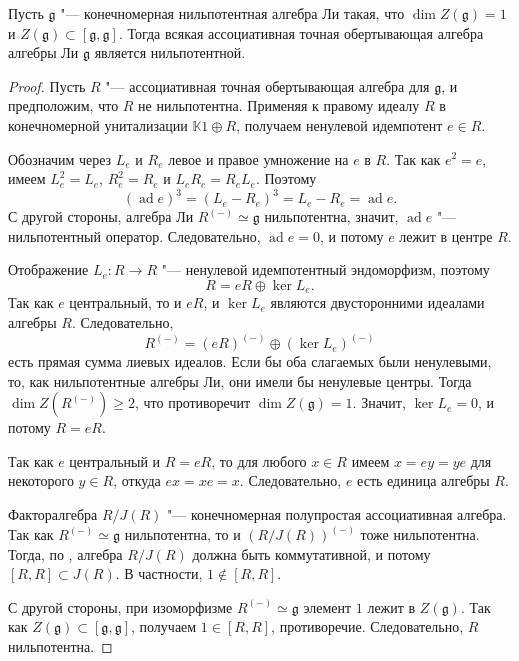 \documentclass[a4paper,14pt,oneside,openany]{memoir}
\begin{document}
\begin{lemma}\label{l:assoc-envelope-nilpotent}
    Пусть $\mathfrak{g}$ "--- конечномерная нильпотентная алгебра Ли такая, что
    $\dim Z(\mathfrak{g})=1$ и $Z(\mathfrak{g})\subset
    [\mathfrak{g},\mathfrak{g}]$. Тогда всякая ассоциативная точная обертывающая
    алгебра алгебры Ли $\mathfrak{g}$ является нильпотентной.
\end{lemma}
\begin{proof}
    Пусть $R$ "--- ассоциативная точная обертывающая алгебра для $\mathfrak{g}$, и
    предположим, что $R$ не нильпотентна. Применяя
     к правому идеалу $R$ в конечномерной
    унитализации $\mathbb{K}1\oplus R$, получаем ненулевой идемпотент $e\in R$.

    Обозначим через $L_e$ и $R_e$ левое и правое умножение на $e$ в $R$. Так как
    $e^2=e$, имеем $L_e^2=L_e$, $R_e^2=R_e$ и $L_eR_e=R_eL_e$. Поэтому
    \[
        (\operatorname{ad}e)^3=(L_e-R_e)^3=L_e-R_e=\operatorname{ad}e.
    \]
    С другой стороны, алгебра Ли $R^{(-)}\simeq \mathfrak{g}$ нильпотентна, значит,
    $\operatorname{ad}e$ "--- нильпотентный оператор. Следовательно,
    $\operatorname{ad}e=0$, и потому $e$ лежит в центре $R$.

    Отображение $L_e\colon R\to R$ "--- ненулевой идемпотентный эндоморфизм,
    поэтому
    \[
        R=eR\oplus\ker L_e.
    \]
    Так как $e$ центральный, то и $eR$, и $\ker L_e$ являются двусторонними
    идеалами алгебры $R$. Следовательно,
    \[
        R^{(-)}=(eR)^{(-)}\oplus (\ker L_e)^{(-)}
    \]
    есть прямая сумма лиевых идеалов. Если бы оба слагаемых были ненулевыми, то,
    как нильпотентные алгебры Ли, они имели бы ненулевые центры. Тогда $\dim
    Z(R^{(-)})\ge 2$, что противоречит $\dim Z(\mathfrak{g})=1$. Значит, $\ker
    L_e=0$, и потому $R=eR$.

    Так как $e$ центральный и $R=eR$, то для любого $x\in R$ имеем $x=ey=ye$ для
    некоторого $y\in R$, откуда $ex=xe=x$. Следовательно, $e$ есть единица алгебры
    $R$.

    Факторалгебра $R/J(R)$ "--- конечномерная полупростая ассоциативная алгебра.
    Так как $R^{(-)}\simeq \mathfrak{g}$ нильпотентна, то и $(R/J(R))^{(-)}$ тоже
    нильпотентна. Тогда, по ,
    алгебра $R/J(R)$ должна быть коммутативной, и потому $ [R,R]\subset J(R) $. В
    частности, $1\notin [R,R]$.

    С другой стороны, при изоморфизме $R^{(-)}\simeq \mathfrak{g}$ элемент $1$
    лежит в $Z(\mathfrak{g})$. Так как $Z(\mathfrak{g})\subset
    [\mathfrak{g},\mathfrak{g}]$, получаем $1\in [R,R]$, противоречие.
    Следовательно, $R$ нильпотентна.
\end{proof}
\end{document}

